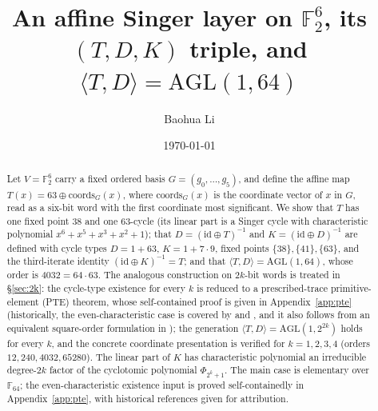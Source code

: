 \documentclass[11pt]{article}
\title{An affine Singer layer on $\mathbb{F}_2^6$, its $(T,D,K)$ triple, and $\langle T,D\rangle = \mathrm{AGL}(1,64)$}
\author{Baohua Li}
\date{\today}
\begin{document}
\maketitle
\begin{abstract}
Let $V=\mathbb{F}_2^6$ carry a fixed ordered basis $G=(g_0,\dots,g_5)$, and define the
affine map $T(x)=63\oplus \mathrm{coords}_G(x)$, where
$\mathrm{coords}_G(x)$ is the coordinate vector of $x$ in $G$, read as a six-bit word with the
first coordinate most significant. We show that $T$ has one fixed point $38$ and one $63$-cycle
(its linear part is a Singer cycle with characteristic polynomial
$x^6+x^5+x^3+x^2+1$); that $D=(\mathrm{id}\oplus T)^{-1}$ and
$K=(\mathrm{id}\oplus D)^{-1}$ are defined with cycle types $D=1+63$, $K=1+7\cdot 9$,
fixed points $\{38\},\{41\},\{63\}$, and the third-iterate identity
$(\mathrm{id}\oplus K)^{-1}=T$; and that $\langle T,D\rangle=\mathrm{AGL}(1,64)$,
whose order is $4032=64\cdot 63$. The analogous construction on $2k$-bit words is treated in \S\ref{sec:2k}: the cycle-type
existence for every $k$ is reduced to a prescribed-trace primitive-element (PTE) theorem, whose self-contained proof is given in Appendix~\ref{app:pte}
(historically, the even-characteristic case is covered by \cite{Mor} and
\cite[Theorem~1, p.~1]{Coh90}, and it also follows from an equivalent square-order formulation in
\cite[Theorem~1.5, p.~170]{Coh}); the generation
$\langle T,D\rangle=\mathrm{AGL}(1,2^{2k})$ holds for every $k$, and the concrete coordinate presentation is verified for $k=1,2,3,4$ (orders $12,240,4032,65280$). The linear
part of $K$ has characteristic polynomial an irreducible degree-$2k$ factor of the
cyclotomic polynomial $\Phi_{2^k+1}$. The main case is elementary over
$\mathbb{F}_{64}$; the even-characteristic existence input is proved self-containedly in Appendix~\ref{app:pte}, with historical references given for attribution.
\end{abstract}
\end{document}
